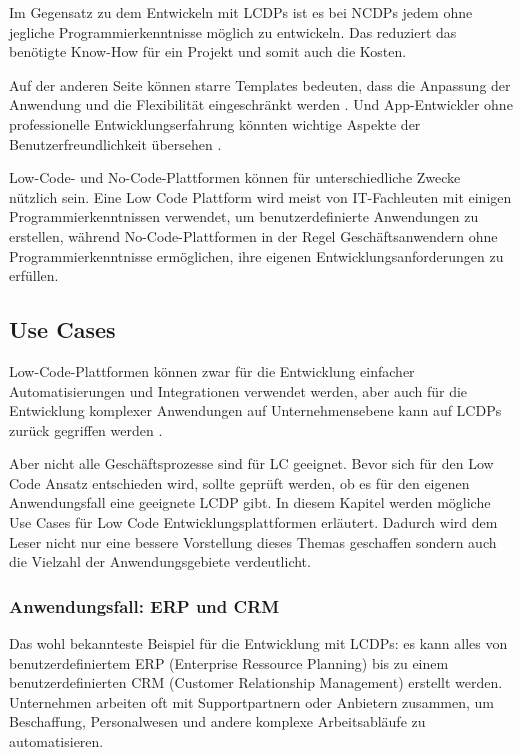 \documentclass[12pt]{article} %
\begin{document}
	Im Gegensatz zu dem Entwickeln mit LCDPs ist es bei NCDPs jedem ohne jegliche Programmierkenntnisse möglich zu entwickeln. Das reduziert das benötigte Know-How für ein Projekt und somit auch die Kosten. \autocite{Microsoft.2023} \newline
	
	Auf der anderen Seite können starre Templates bedeuten, dass die Anpassung der Anwendung und die Flexibilität eingeschränkt werden \autocite{Microsoft.2023}.
	Und App-Entwickler ohne professionelle Entwicklungserfahrung könnten wichtige Aspekte der Benutzerfreundlichkeit übersehen \autocite{Microsoft.2023}. \newline	
	
	Low-Code- und No-Code-Plattformen können für unterschiedliche Zwecke nützlich sein. Eine Low Code Plattform wird meist von IT-Fachleuten mit einigen Programmierkenntnissen verwendet, um benutzerdefinierte Anwendungen zu erstellen, während No-Code-Plattformen in der Regel Geschäftsanwendern ohne Programmierkenntnisse ermöglichen, ihre eigenen Entwicklungsanforderungen zu erfüllen. \autocite{Microsoft.2023} 

	\subsection{Use Cases}	
	Low-Code-Plattformen können zwar für die Entwicklung einfacher Automatisierungen und Integrationen verwendet werden, aber auch für die Entwicklung komplexer Anwendungen auf Unternehmensebene kann auf LCDPs zurück gegriffen werden \autocite{KevinShuler.2023}. \newline
	
	Aber nicht alle Geschäftsprozesse sind für LC geeignet. Bevor sich für den Low Code Ansatz entschieden wird, sollte geprüft werden, ob es für den eigenen Anwendungsfall eine geeignete LCDP gibt. In diesem Kapitel werden mögliche Use Cases für Low Code Entwicklungsplattformen erläutert. Dadurch wird dem Leser nicht nur eine bessere Vorstellung dieses Themas geschaffen sondern auch die Vielzahl der Anwendungsgebiete verdeutlicht.

	\subsubsection{Anwendungsfall: ERP und CRM}
	Das wohl bekannteste Beispiel für die Entwicklung mit LCDPs: es kann alles von benutzerdefiniertem ERP (Enterprise Ressource Planning) bis zu einem benutzerdefinierten CRM (Customer Relationship Management) erstellt werden. Unternehmen arbeiten oft mit Supportpartnern oder Anbietern zusammen, um Beschaffung, Personalwesen und andere komplexe Arbeitsabläufe zu automatisieren. \autocite{KevinShuler.2023}
	
\end{document}

